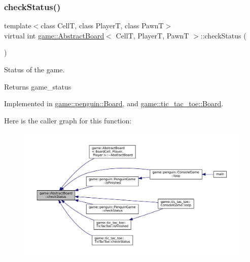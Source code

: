 \subsubsection{\texorpdfstring{check\+Status()}{checkStatus()}}
{\footnotesize\ttfamily template$<$class CellT, class PlayerT, class PawnT$>$ \\
virtual int \hyperlink{classgame_1_1_abstract_board}{game\+::\+Abstract\+Board}$<$ CellT, PlayerT, PawnT $>$\+::check\+Status (\begin{DoxyParamCaption}{ }\end{DoxyParamCaption})\hspace{0.3cm}{\ttfamily [pure virtual]}}



Status of the game. 

\begin{DoxyReturn}{Returns}
game\+\_\+status 
\end{DoxyReturn}


Implemented in \hyperlink{classgame_1_1penguin_1_1_board_a3d659743bc33b43168c82dc4e2d3b00e}{game\+::penguin\+::\+Board}, and \hyperlink{classgame_1_1tic__tac__toe_1_1_board_ae91180193e944c9c58d7d1d0f439918e}{game\+::tic\+\_\+tac\+\_\+toe\+::\+Board}.

Here is the caller graph for this function\+:
\nopagebreak
\begin{figure}[H]
\begin{center}
\leavevmode
\includegraphics[width=350pt]{classgame_1_1_abstract_board_a689982e6640633d78008157906c6d63a_icgraph}
\end{center}
\end{figure}
\mbox{\label{classgame_1_1_abstract_board_abd467b64fd2c0dfbc0ce87200afb3e9e}} 
